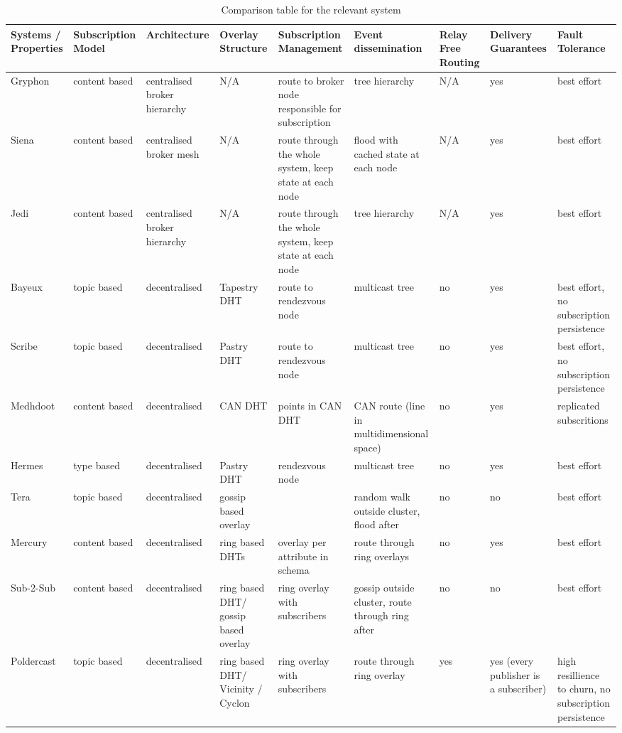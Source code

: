 \begin{table}
  \center
    \begin{tabular}{|p{2cm}|P{2cm}P{2cm}P{2cm}P{2cm}P{2cm}P{2cm}P{2cm}P{2cm}|}\hline
    Systems / Properties & Subscription Model & Architecture & Overlay Structure & Subscription Management & Event dissemination & Relay Free Routing & Delivery Guarantees & Fault Tolerance \\\hline
    Gryphon & content based & centralised broker hierarchy & N/A & route to broker node responsible for subscription & tree hierarchy & N/A & yes & best effort \\
    Siena & content based & centralised broker mesh & N/A & route through the whole system, keep state at each node & flood with cached state at each node & N/A & yes & best effort \\
    Jedi & content based & centralised broker hierarchy & N/A & route through the whole system, keep state at each node & tree hierarchy & N/A & yes & best effort \\
    Bayeux & topic based & decentralised & Tapestry DHT & route to rendezvous node & multicast tree & no & yes & best effort, no subscription persistence \\
    Scribe & topic based & decentralised & Pastry DHT & route to rendezvous node & multicast tree & no & yes & best effort, no subscription persistence \\
    Medhdoot & content based & decentralised & CAN DHT & points in CAN DHT & CAN route (line in multidimensional space) & no & yes & replicated subscritions \\
    Hermes & type based & decentralised & Pastry DHT & rendezvous node & multicast tree & no & yes & best effort \\
    Tera & topic based & decentralised & gossip based overlay &  & random walk outside cluster, flood after & no & no & best effort \\
    Mercury & content based & decentralised & ring based DHTs & overlay per attribute in schema & route through ring overlays & no & yes & best effort \\
    Sub-2-Sub & content based & decentralised & ring based DHT/ gossip based overlay & ring overlay with subscribers & gossip outside cluster, route through ring after & no & no & best effort \\
    Poldercast & topic based & decentralised & ring based DHT/ Vicinity / Cyclon & ring overlay with subscribers & route through ring overlay & yes & yes (every publisher is a subscriber) & high resillience to churn, no subscription persistence \\\hline
    \end{tabular}
  \caption{Comparison table for the relevant system}
  \label{table:relevant-systems}
\end{table}
